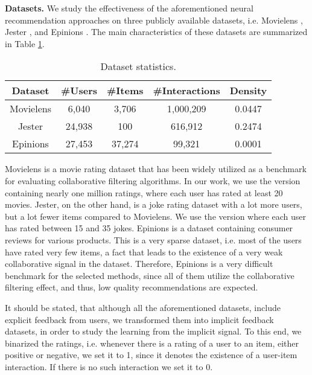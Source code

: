 \textbf{Datasets.}
We study the effectiveness of the aforementioned neural recommendation approaches on three publicly available datasets, i.e. Movielens \cite{harper2016movielens}, Jester \cite{jester}, and Epinions \cite{epinions}. 
The main characteristics of these datasets are summarized in Table \ref{tab:datasets}.

\begin{table}[h]
    \centering
    \begin{tabular}{c|c|c|c|c}
        \hline
        Dataset & \#Users & \#Items & \#Interactions & Density \\
        \hline
        Movielens &  6,040 &  3,706 & 1,000,209 & 0.0447 \\
        Jester    & 24,938 &    100 &   616,912 & 0.2474 \\
        Epinions  & 27,453 & 37,274 &    99,321 & 0.0001
    \end{tabular}
    \caption{Dataset statistics.}
    \label{tab:datasets}
\end{table}

Movielens is a movie rating dataset that has been widely utilized as a benchmark for evaluating collaborative filtering algorithms.
In our work, we use the version containing nearly one million ratings, where each user has rated at least 20 movies.
Jester, on the other hand, is a joke rating dataset with a lot more users, but a lot fewer items compared to Movielens.
We use the version where each user has rated between 15 and 35 jokes.
Epinions is a dataset containing consumer reviews for various products. 
This is a very sparse dataset, i.e. most of the users have rated very few items, a fact that leads to the existence of a very weak collaborative signal in the dataset. 
Therefore, Epinions is a very difficult benchmark for the selected methods, since all of them utilize the collaborative filtering effect, and thus, low quality recommendations are expected.

It should be stated, that although all the aforementioned datasets, include explicit feedback from users, we transformed them into implicit feedback datasets, in order to study the learning from the implicit signal.
To this end, we binarized the ratings, i.e. whenever there is a rating of a user to an item, either positive or negative, we set it to 1, since it denotes the existence of a user-item interaction. 
If there is no such interaction we set it to 0.

